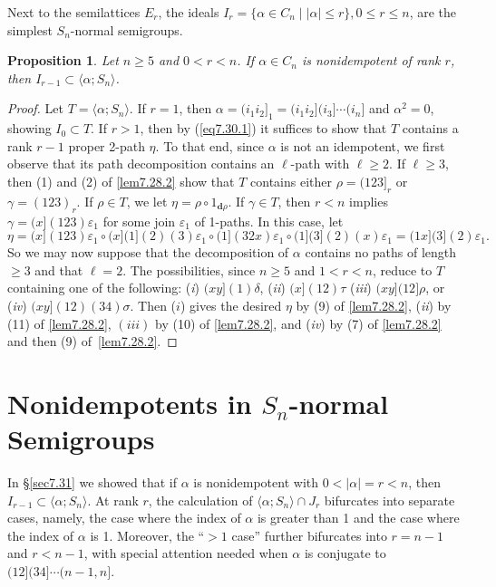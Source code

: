 \documentclass{surv-l}
\numberwithin{equation}{section}
\numberwithin{table}{section}
\numberwithin{figure}{section}
\newtheorem{proposition}[equation]{Proposition}
\theoremstyle{definition}
\begin{document}
Next to the semilattices $E_{r}$, the ideals $I_{r}=\{\alpha\in
C_{n}\mid |\alpha|\leq r\}, 0\leq r\leq n$, are the simplest
$S_{n}$-normal semigroups.

\begin{proposition}\label{prop2.31.2}
Let $n \geq 5$ and $0<r<n$. If $\alpha\in C_{n}$ is nonidempotent
of rank $r$, then $I_{r-1}\subset\langle\alpha;S_{n}\rangle$.
\end{proposition}

\begin{proof}Let $T=\langle\alpha;S_{n}\rangle$. If $r=1$, then
$\alpha=(i_{1}i_{2}]_{1}=(i_{1}i_{2}](i_{3}]\cdots(i_{n}]$ and
$\alpha^{2}=0$, showing $I_{0}\subset T$. If $r>1$, then by
(\ref{eq7.30.1}) it suffices to show that $T$ contains a rank
$r-1$ proper 2-path $\eta$. To that end, since $\alpha$ is not an
idempotent, we first observe that its path decomposition contains
an $\ell$-path with $\ell\geq 2$. If $\ell\geq 3$, then (1) and
(2) of \ref{lem7.28.2} show that $T$ contains either
$\rho=(123]_{r}$ or $\gamma=(123)_{r}$. If $\rho\in T$, we let
$\eta=\rho \circ 1_{\mathbf{d}\rho}$. If $\gamma\in T$, then $r<n$
implies $\gamma=(x](123)\varepsilon_{1}$ for some join
$\varepsilon_{1}$ of 1-paths. In this case, let
\[
\eta=(x](123)\varepsilon_{1}\circ
(x](1](2)(3)\varepsilon_{1}\circ (1](32x)\varepsilon_{1}\circ
(1](3](2)(x)\varepsilon_{1}=(1x](3](2)\varepsilon_{1}.
\]
So we may now suppose that the decomposition of $\alpha$ contains
no paths of length $\geq 3$ and that $\ell=2$. The possibilities,
since $n \geq 5$ and $1<r<n$, reduce to $T$ containing one of the
following: (\emph{i}) $(xy](1)\delta$, (\emph{ii}) $(x](12)\tau$ (\emph{iii}) $(xy](12]\rho$,
or (\emph{iv}) $(xy](12)(34)\sigma$. Then ($i$) gives the desired
$\eta$ by (9) of \ref{lem7.28.2}, (\emph{ii}) by (11) of
\ref{lem7.28.2}, $(iii)$ by (10) of \ref{lem7.28.2}, and
(\emph{iv}) by (7) of \ref{lem7.28.2} and then (9)
of~\ref{lem7.28.2}.
\end{proof}

\section{Nonidempotents in $S_{n}$-normal Semigroups}\label{sec7.32}

In \S\ref{sec7.31} we showed that if $\alpha$ is nonidempotent
with $0<|\alpha|=r<n$, then
$I_{r-1}\subset\langle\alpha;S_{n}\rangle$. At rank $r$, the
calculation of $\langle\alpha;S_{n}\rangle\cap J_{r}$ bifurcates into
separate cases, namely, the case where the index of $\alpha$ is
greater than 1 and the case where the index of $\alpha$ is 1.
Moreover, the ``$>1$ case'' further bifurcates into $r=n -1$ and
$r<n -1$, with special attention needed when $\alpha$ is conjugate
to $(12](34]\cdots(n-1, n]$.
\end{document}
